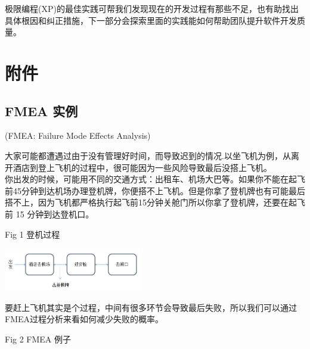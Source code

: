 
极限编程(XP)的最佳实践可帮我们发现现在的开发过程有那些不足，也有助找出具体根因和纠正措施，下一部分会探索里面的实践能如何帮助团队提升软件开发质量。


\hypertarget{ux9644ux4ef6}{%
\section{附件}\label{ux9644ux4ef6}}

\hypertarget{fmea-ux5b9eux4f8b}{%
\subsection{FMEA 实例}\label{fmea-ux5b9eux4f8b}}

\begin{description}
\tightlist
\item[]
(FMEA: Failure Mode Effects Analysis)
\end{description}

大家可能都遭遇过由于没有管理好时间，而导致迟到的情况.以坐飞机为例，从离开酒店到登上飞机的过程中，很可能因为一些风险导致最后没搭上飞机。\\
你出发的时候，可能用不同的交通方式：出租车、机场大巴等。如果你不能在起飞前45分钟到达机场办理登机牌，你便搭不上飞机。但是你拿了登机牌也有可能最后搭不上，因为飞机都严格执行起飞前15分钟关舱门所以你拿了登机牌，还要在起飞前
15 分钟到达登机口。

Fig 1 登机过程


\includegraphics[width=6cm]{风险与机会1.png}


要赶上飞机其实是个过程，中间有很多环节会导致最后失败，所以我们可以通过FMEA过程分析来看如何减少失败的概率。

Fig 2 FMEA 例子


